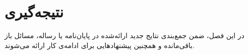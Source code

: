 \chapter{نتیجه‌گیری}

در این فصل، ضمن جمع‌بندی نتایج جدید ارائه‌شده در پایان‌نامه یا رساله، 
مسائل باز باقی‌مانده و همچنین پیشنهادهایی برای ادامه‌ی کار ارائه می‌شوند.
